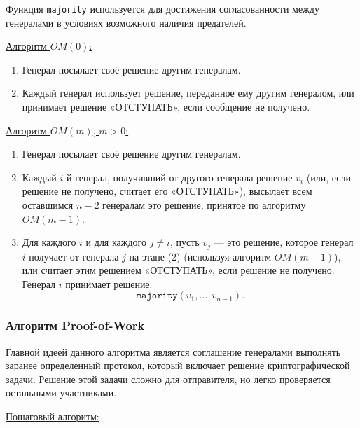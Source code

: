 Функция \texttt{majority} используется для достижения согласованности между генералами в условиях возможного наличия предателей.~\cite{vmath}

\underline{Алгоритм \(OM(0)\):}

\begin{enumerate}
    \item Генерал посылает своё решение другим генералам.
    \item Каждый генерал использует решение, переданное ему другим генералом, или принимает решение «ОТСТУПАТЬ», если сообщение не получено.
\end{enumerate}

\underline{Алгоритм \(OM(m)\), \(m > 0\):}

\begin{enumerate}
    \item Генерал посылает своё решение другим генералам.
    \item Каждый \(i\)-й генерал, получивший от другого генерала решение \(v_i\) (или, если решение не получено, считает его «ОТСТУПАТЬ»), высылает всем оставшимся \(n - 2\) генералам это решение, принятое по алгоритму \(OM(m-1)\).
    \item Для каждого \(i\) и для каждого \(j \neq i\), пусть \(v_j\) — это решение, которое генерал \(i\) получает от генерала \(j\) на этапе (2) (используя алгоритм \(OM(m-1)\)), или считает этим решением «ОТСТУПАТЬ», если решение не получено. Генерал \(i\) принимает решение:
    \[
    \texttt{majority}(v_1, \dots, v_{n-1}).
    \]
\end{enumerate}


\subsubsection{Алгоритм Proof-of-Work}

\hspace{1.25cm}
Главной идеей данного алгоритма является соглашение генералами выполнять заранее определенный протокол, который включает решение криптографической задачи. Решение этой задачи сложно для отправителя, но легко проверяется остальными участниками.

\underline{Пошаговый алгоритм:}

